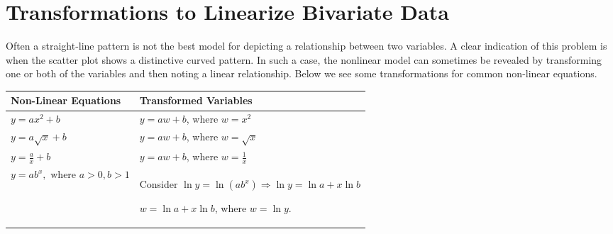 \documentclass[11pt,a4paper]{book}
\begin{document}
\newpage{}

\section{Transformations to Linearize Bivariate Data}

Often a straight-line pattern is not the best model for depicting
a relationship between two variables. A clear indication of this problem
is when the scatter plot shows a distinctive curved pattern. In such
a case, the nonlinear model can sometimes be revealed by transforming
one or both of the variables and then noting a linear relationship.
Below we see some transformations for common non-linear equations.
\begin{center}
\setlength{\extrarowheight}{2pt}%
\begin{tabular}{|>{\centering}m{6cm}|>{\centering}m{8cm}|}
\hline
\medskip

Non-Linear Equations

\smallskip & \medskip

Transformed Variables

\smallskip\tabularnewline
\hline
\smallskip

$y=ax^{2}+b$

\smallskip & \smallskip

$y=aw+b$, where $w=x^{2}$

\smallskip\tabularnewline
\hline
\smallskip

$y=a\sqrt{x}+b$

\smallskip & \smallskip

$y=aw+b$, where $w=\sqrt{x}$

\smallskip\tabularnewline
\hline
\smallskip

${\displaystyle y=\frac{a}{x}+b}$

\smallskip & \smallskip

$y=aw+b$, where ${\displaystyle w=\frac{1}{x}}$

\smallskip\tabularnewline
\hline
\smallskip

$y=ab^{x},\text{ where }a>0,b>1$

\smallskip & Consider $\ln y=\ln\left(ab^{x}\right)\Rightarrow\ln y=\ln a+x\ln b$

$w=\ln a+x\ln b$, where $w=\ln y$.\tabularnewline
\hline
\end{tabular}
\par\end{center}
\end{document}
